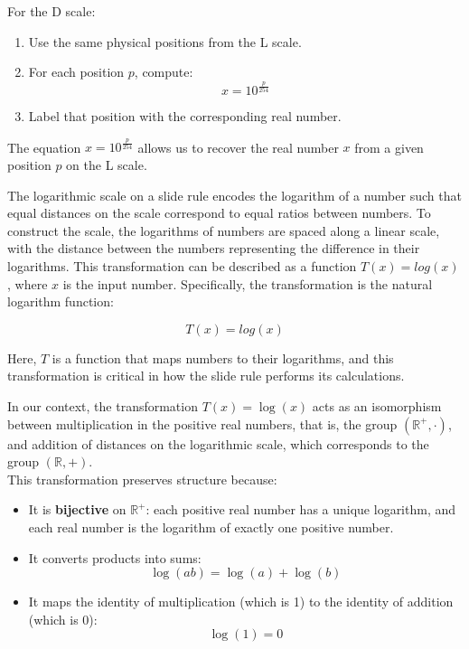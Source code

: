 \documentclass[10pt,twocolumn]{article}
\begin{document}
For the D scale:

\begin{enumerate}
  \item Use the same physical positions from the L scale.
  \item For each position \( p \), compute:
  \[
  x = 10^{\frac{p}{254}}
  \]
  \item Label that position with the corresponding real number.
\end{enumerate}

The equation \( x = 10^{\frac{p}{254}} \) allows us to recover the real number \( x \) from a given position \( p \) on the L scale. 

The logarithmic scale on a slide rule encodes the logarithm of a number such that equal distances on the scale correspond to equal ratios between numbers. To construct the scale, the logarithms of numbers are spaced along a linear scale, with the distance between the numbers representing the difference in their logarithms. This transformation can be described as a function \( T(x) = log(x) \), where \( x \) is the input number. Specifically, the transformation is the natural logarithm function:

\[
T(x) = log(x)
\]

Here, \( T \) is a function that maps numbers to their logarithms, and this transformation is critical in how the slide rule performs its calculations.

In our context, the transformation \( T(x) = \log(x) \) acts as an isomorphism between multiplication in the positive real numbers, that is, the group \( (\mathbb{R}^+, \cdot) \), and addition of distances on the logarithmic scale, which corresponds to the group \( (\mathbb{R}, +) \).\\

This transformation preserves structure because:

\begin{itemize}
    \item It is \textbf{bijective} on \( \mathbb{R}^+ \): each positive real number has a unique logarithm, and each real number is the logarithm of exactly one positive number.\\
    \item It converts products into sums: 
    \[
    \log(ab) = \log(a) + \log(b)
    \]
    \item It maps the identity of multiplication (which is 1) to the identity of addition (which is 0):
    \[
    \log(1) = 0
    \]
\end{itemize}
\end{document}
